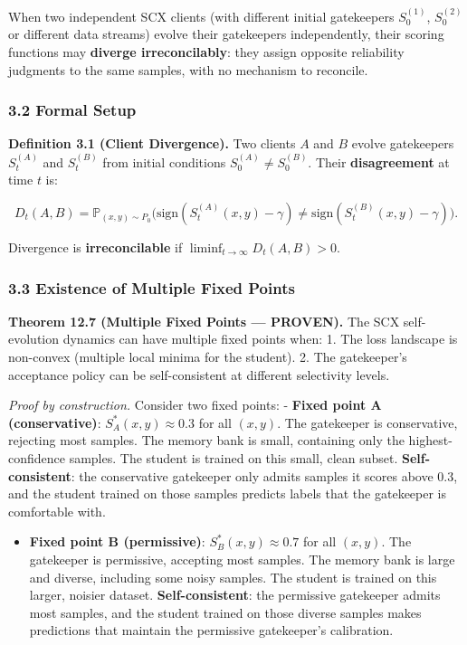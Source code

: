 \documentclass[
  12pt,
]{article}
\providecommand{\tightlist}{%
  \setlength{\itemsep}{0pt}\setlength{\parskip}{0pt}}
\begin{document}
When two independent SCX clients (with different initial gatekeepers
\(S_0^{(1)}\), \(S_0^{(2)}\) or different data streams) evolve their
gatekeepers independently, their scoring functions may \textbf{diverge
irreconcilably}: they assign opposite reliability judgments to the same
samples, with no mechanism to reconcile.

\subsubsection{3.2 Formal Setup}\label{formal-setup}

\textbf{Definition 3.1 (Client Divergence).} Two clients \(A\) and \(B\)
evolve gatekeepers \(S_t^{(A)}\) and \(S_t^{(B)}\) from initial
conditions \(S_0^{(A)} \neq S_0^{(B)}\). Their \textbf{disagreement} at
time \(t\) is:

\[D_t(A, B) = \mathbb{P}_{(x,y) \sim P_0}\bigl(\text{sign}(S_t^{(A)}(x,y) - \gamma) \neq \text{sign}(S_t^{(B)}(x,y) - \gamma)\bigr).\]

Divergence is \textbf{irreconcilable} if
\(\liminf_{t \to \infty} D_t(A, B) > 0\).

\subsubsection{3.3 Existence of Multiple Fixed
Points}\label{existence-of-multiple-fixed-points}

\textbf{Theorem 12.7 (Multiple Fixed Points --- PROVEN).} The SCX
self-evolution dynamics can have multiple fixed points when: 1. The loss
landscape is non-convex (multiple local minima for the student). 2. The
gatekeeper's acceptance policy can be self-consistent at different
selectivity levels.

\emph{Proof by construction.} Consider two fixed points: - \textbf{Fixed
point A (conservative)}: \(S_A^*(x,y) \approx 0.3\) for all \((x,y)\).
The gatekeeper is conservative, rejecting most samples. The memory bank
is small, containing only the highest-confidence samples. The student is
trained on this small, clean subset. \textbf{Self-consistent}: the
conservative gatekeeper only admits samples it scores above 0.3, and the
student trained on those samples predicts labels that the gatekeeper is
comfortable with.

\begin{itemize}
\tightlist
\item
  \textbf{Fixed point B (permissive)}: \(S_B^*(x,y) \approx 0.7\) for
  all \((x,y)\). The gatekeeper is permissive, accepting most samples.
  The memory bank is large and diverse, including some noisy samples.
  The student is trained on this larger, noisier dataset.
  \textbf{Self-consistent}: the permissive gatekeeper admits most
  samples, and the student trained on those diverse samples makes
  predictions that maintain the permissive gatekeeper's calibration.
\end{itemize}
\end{document}
